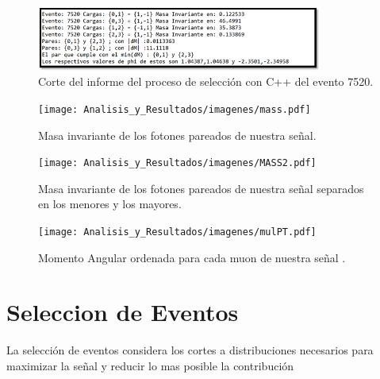 \begin{figure}[ht!]
    \centering
    \includegraphics[width=0.84\textwidth]{Analisis_y_Resultados/imagenes/evento_7520_info.png}
    \caption{Corte del informe del proceso de selección con C++ del evento 7520.}
    \label{fig:diagrama_pair}
\end{figure}

\begin{figure}[ht!]
    \centering
    \texttt{[image: Analisis\_y\_Resultados/imagenes/mass.pdf]}
    \caption{Masa invariante de los fotones pareados de nuestra se\~nal.}
    \label{fig:diagrama_pair}
\end{figure}

\begin{figure}[ht!]
    \centering
    \texttt{[image: Analisis\_y\_Resultados/imagenes/MASS2.pdf]}
    \caption{Masa invariante de los fotones pareados de nuestra se\~nal separados en los menores y los mayores.}
    \label{fig:diagrama_pair}
\end{figure}

\begin{figure}[ht!]
    \centering
    \texttt{[image: Analisis\_y\_Resultados/imagenes/mulPT.pdf]}
    \caption{Momento Angular ordenada para cada muon de nuestra se\~nal .}
    \label{fig:diagrama_pair}
\end{figure}



\section{Seleccion de Eventos}

La selecci\'on de eventos considera los cortes a distribuciones necesarios para maximizar la se\~nal y reducir lo mas posible la contribuci\'on 

